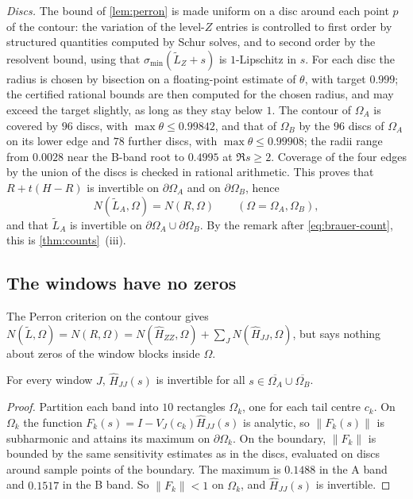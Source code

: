 \emph{Discs.} The bound of \cref{lem:perron} is made uniform on a disc around each point $p$ of the contour:
the variation of the level-$Z$ entries is controlled to first order by structured quantities computed by Schur
solves, and to second order by the resolvent bound, using that $\sigma_{\min}(\widetilde L_Z+s)$ is
$1$-Lipschitz in $s$. For each disc the radius is chosen by bisection on a floating-point estimate of $\theta$, with target $0.999$; the
certified rational bounds are then computed for the chosen radius, and may exceed the target slightly, as long as they
stay below $1$. The contour of $\Omega_A$ is
covered by $96$ discs, with $\max\theta\le0.99842$, and that of $\Omega_B$ by the $96$ discs of $\Omega_A$ on its
lower edge and $78$ further discs, with $\max\theta\le0.99908$; the radii range from $0.0028$ near the B-band
root to $0.4995$ at $\Re s\ge2$. Coverage of the four edges by the union of the discs is checked in rational
arithmetic. This proves that $R+t(H-R)$ is invertible on $\partial\Omega_A$ and on $\partial\Omega_B$, hence
\[
  N(\widetilde L_A,\Omega)=N(R,\Omega)\qquad(\Omega=\Omega_A,\Omega_B),
\]
and that $\widetilde L_A$ is invertible on $\partial\Omega_A\cup\partial\Omega_B$. By the remark after
\eqref{eq:brauer-count}, this is \cref{thm:counts}~(iii).

\subsection{The windows have no zeros}\label{sec:counting-windows}

The Perron criterion on the contour gives $N(\widetilde L,\Omega)=N(R,\Omega)=N(\widehat H_{ZZ},\Omega)+
\sum_JN(\widehat H_{JJ},\Omega)$, but says nothing about zeros of the window blocks inside $\Omega$.

\begin{lemma}\label{lem:windows}
For every window $J$, $\widehat H_{JJ}(s)$ is invertible for all $s\in\overline{\Omega_A}\cup\overline{\Omega_B}$.
\end{lemma}

\begin{proof}
Partition each band into $10$ rectangles $\Omega_k$, one for each tail centre $c_k$. On $\Omega_k$ the function
$F_k(s)=I-V_J(c_k)\widehat H_{JJ}(s)$ is analytic, so $\|F_k(s)\|$ is subharmonic and attains its maximum on
$\partial\Omega_k$. On the boundary, $\|F_k\|$ is bounded by the same sensitivity estimates as in the discs,
evaluated on discs around sample points of the boundary. The maximum is $0.1488$ in the A band and $0.1517$ in the B band.
So $\|F_k\|<1$ on $\Omega_k$, and $\widehat H_{JJ}(s)$ is invertible.
\end{proof}

